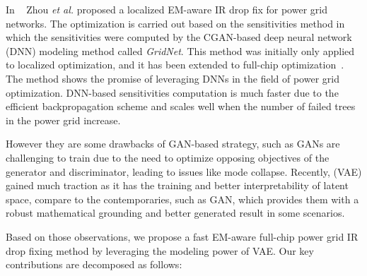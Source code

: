 In ~\cite{ZhouJin:ICCAD'20} Zhou {\it et al.} proposed a localized EM-aware IR drop fix for power grid networks. The optimization is carried out based on the sensitivities method in which the sensitivities were computed by the CGAN-based deep neural network (DNN) modeling method called {\it GridNet}. This method was initially only applied to localized optimization, and it has been extended to full-chip optimization~\cite{HanLiu:TCAD'22-23}.  The method shows the promise of leveraging DNNs in the field of power grid optimization. DNN-based sensitivities computation is much faster due to the efficient backpropagation scheme and scales well when the number of failed trees in the power grid increase.

However they are some drawbacks of GAN-based strategy, such as GANs are challenging to train due to the need to optimize opposing objectives of the generator and discriminator, leading to issues like mode collapse. Recently,  (VAE) gained much traction as it has the training and better interpretability of latent space, compare to the contemporaries, such as GAN, which provides them with a robust mathematical grounding and better generated result in some scenarios. 

Based on those observations, we propose a fast EM-aware full-chip power grid IR drop fixing method by leveraging the modeling power of VAE. Our key contributions are decomposed as follows:

